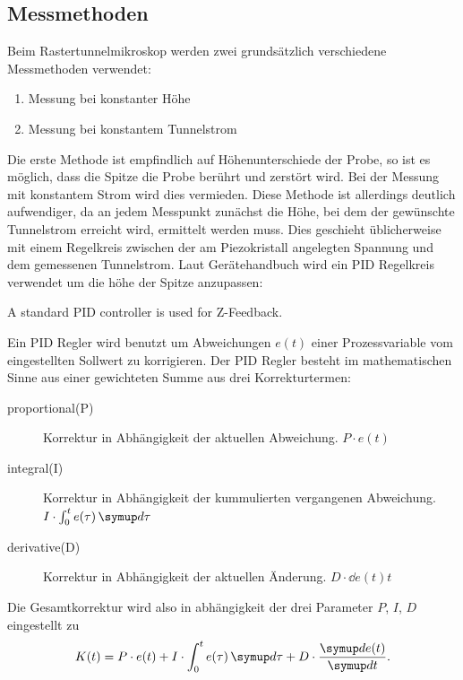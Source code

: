 \subsection{Messmethoden}

Beim Rastertunnelmikroskop werden zwei grundsätzlich verschiedene Messmethoden verwendet:
\begin{enumerate}
  \item Messung bei konstanter Höhe
  \item Messung bei konstantem Tunnelstrom
\end{enumerate}

Die erste Methode ist empfindlich auf Höhenunterschiede der Probe, so ist es möglich, dass die Spitze die Probe berührt und zerstört wird.
Bei der Messung mit konstantem Strom wird dies vermieden.
Diese Methode ist allerdings deutlich aufwendiger, da an jedem Messpunkt zunächst die Höhe, bei dem der gewünschte Tunnelstrom erreicht wird, ermittelt werden muss.
Dies geschieht üblicherweise mit einem Regelkreis zwischen der am Piezokristall angelegten Spannung und dem gemessenen Tunnelstrom.
Laut Gerätehandbuch wird ein PID Regelkreis verwendet um die höhe der Spitze anzupassen:

\begin{displayquote}
  A standard PID controller is used for Z-Feedback.~\cite{naio}
\end{displayquote}

Ein PID Regler wird benutzt um Abweichungen $e(t)$ einer Prozessvariable vom eingestellten Sollwert zu korrigieren.
Der PID Regler besteht im mathematischen Sinne aus einer gewichteten Summe aus drei Korrekturtermen:

\begin{description}
  \item[proportional(P)] Korrektur in Abhängigkeit der aktuellen Abweichung. $P \cdot e(t)$
  \item[integral(I)] Korrektur in Abhängigkeit der kummulierten vergangenen Abweichung. $I \cdot \int_0^t e(\tau) \dif{\tau}$
  \item[derivative(D)] Korrektur in Abhängigkeit der aktuellen Änderung. $D \cdot \dd{e(t)}{t}$
\end{description}

Die Gesamtkorrektur wird also in abhängigkeit der drei Parameter $P$, $I$, $D$ eingestellt zu
\begin{equation*}
  K(t) = P \cdot e(t) + I \cdot \int_0^t e(\tau) \dif{\tau} + D \cdot \dd{e(t)}{t}.
\end{equation*}

